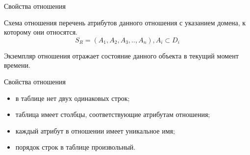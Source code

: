 \documentclass{beamer}
\begin{document}
\begin{frame}{Свойства отношения}
\begin{block}{Схема отношения}
перечень атрибутов данного отношения с указанием домена, к которому они относятся. 
\[ S_{R} = (A_{1},A_{2},A_{3},..,A_{n}), A_{i} \subset D_{i} \]
\end{block}
\begin{block}{Экземпляр отношения}
отражает состояние данного объекта в текущий момент времени. 
\end{block}
\begin{block}{Свойства отношения}
\begin{itemize}
\item в таблице нет двух одинаковых строк;
\item таблица имеет столбцы, соответствующие атрибутам отношения;
\item каждый атрибут в отношении имеет уникальное имя;
\item порядок строк в таблице произвольный.
\end{itemize}
\end{block}
\end{frame}
\end{document}
